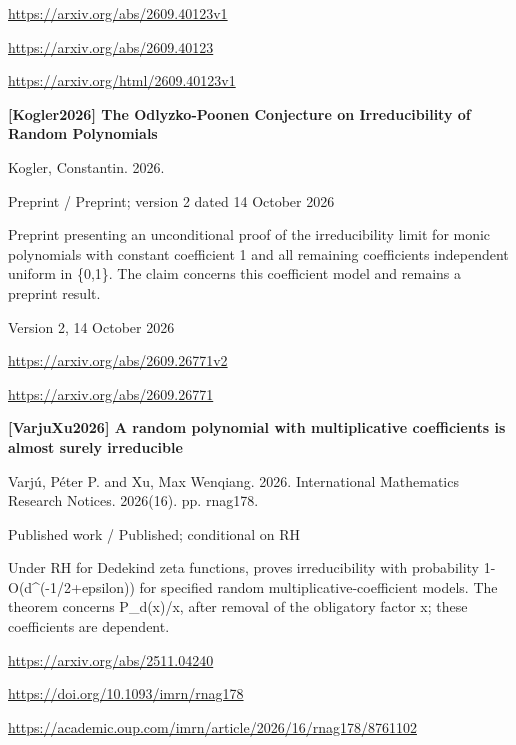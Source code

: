 \documentclass[11pt,a4paper,oneside,openany]{book}
\begin{document}
{\footnotesize\url{https://arxiv.org/abs/2609.40123v1}}\par
{\footnotesize\url{https://arxiv.org/abs/2609.40123}}\par
{\footnotesize\url{https://arxiv.org/html/2609.40123v1}}\par
\vspace{9pt}
\hypertarget{ref:Kogler2026}{}
{\sffamily\bfseries\color{atlasgreen}[Kogler2026] The Odlyzko-Poonen Conjecture on Irreducibility of Random Polynomials}\par
\color{black} Kogler, Constantin. 2026.\par
{\small\sffamily\color{atlasgold}Preprint / Preprint; version 2 dated 14 October 2026}\par
\color{black} Preprint presenting an unconditional proof of the irreducibility limit for monic polynomials with constant coefficient 1 and all remaining coefficients independent uniform in \{0,1\}. The claim concerns this coefficient model and remains a preprint result.\par
{\small Version 2, 14 October 2026}\par
{\footnotesize\url{https://arxiv.org/abs/2609.26771v2}}\par
{\footnotesize\url{https://arxiv.org/abs/2609.26771}}\par
\vspace{9pt}
\hypertarget{ref:VarjuXu2026}{}
{\sffamily\bfseries\color{atlasgreen}[VarjuXu2026] A random polynomial with multiplicative coefficients is almost surely irreducible}\par
\color{black} Varjú, Péter P. and Xu, Max Wenqiang. 2026. International Mathematics Research Notices. 2026(16). pp. rnag178.\par
{\small\sffamily\color{atlasgold}Published work / Published; conditional on RH}\par
\color{black} Under RH for Dedekind zeta functions, proves irreducibility with probability 1-O(d\textasciicircum{}(-1/2+epsilon)) for specified random multiplicative-coefficient models. The theorem concerns P\_\allowbreak{}d(x)/x, after removal of the obligatory factor x; these coefficients are dependent.\par
{\footnotesize\url{https://arxiv.org/abs/2511.04240}}\par
{\footnotesize\url{https://doi.org/10.1093/imrn/rnag178}}\par
{\footnotesize\url{https://academic.oup.com/imrn/article/2026/16/rnag178/8761102}}\par
\end{document}
